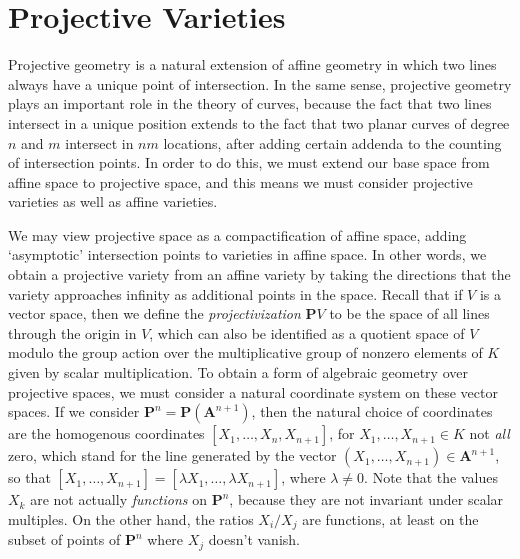 \chapter{Projective Varieties}

Projective geometry is a natural extension of affine geometry in which two lines always have a unique point of intersection. In the same sense, projective geometry plays an important role in the theory of curves, because the fact that two lines intersect in a unique position extends to the fact that two planar curves of degree $n$ and $m$ intersect in $nm$ locations, after adding certain addenda to the counting of intersection points. In order to do this, we must extend our base space from affine space to projective space, and this means we must consider projective varieties as well as affine varieties.

We may view projective space as a compactification of affine space, adding `asymptotic' intersection points to varieties in affine space. In other words, we obtain a projective variety from an affine variety by taking the directions that the variety approaches infinity as additional points in the space. Recall that if $V$ is a vector space, then we define the {\it projectivization} $\mathbf{P} V$ to be the space of all lines through the origin in $V$, which can also be identified as a quotient space of $V$ modulo the group action over the multiplicative group of nonzero elements of $K$ given by scalar multiplication. To obtain a form of algebraic geometry over projective spaces, we must consider a natural coordinate system on these vector spaces. If we consider $\mathbf{P}^n = \mathbf{P}(\mathbf{A}^{n+1})$, then the natural choice of coordinates are the homogenous coordinates $[X_1, \dots, X_n, X_{n+1}]$, for $X_1, \dots, X_{n+1} \in K$ not {\it all} zero, which stand for the line generated by the vector $(X_1, \dots, X_{n+1}) \in \mathbf{A}^{n+1}$, so that $[X_1, \dots, X_{n+1}] = [\lambda X_1, \dots, \lambda X_{n+1}]$, where $\lambda \neq 0$. Note that the values $X_k$ are not actually {\it functions} on $\mathbf{P}^n$, because they are not invariant under scalar multiples. On the other hand, the ratios $X_i/X_j$ are functions, at least on the subset of points of $\mathbf{P}^n$ where $X_j$ doesn't vanish.

